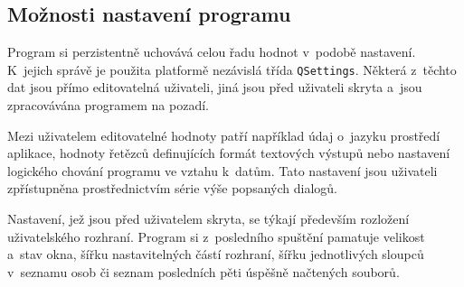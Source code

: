 		\subsection*{Možnosti nastavení programu}
		Program si perzistentně uchovává celou řadu hodnot v~podobě nastavení. K~jejich správě je použita platformě nezávislá třída \texttt{QSettings}. Některá z~těchto dat jsou přímo editovatelná uživateli, jiná jsou před uživateli skryta a~jsou zpracovávána programem na pozadí.\par
		Mezi uživatelem editovatelné hodnoty patří například údaj o~jazyku prostředí aplikace, hodnoty řetězců definujících formát textových výstupů nebo nastavení logického chování programu ve vztahu k~datům. Tato nastavení jsou uživateli zpřístupněna prostřednictvím série výše popsaných dialogů.\par
		Nastavení, jež jsou před uživatelem skryta, se týkají především rozložení uživatelského rozhraní. Program si z~posledního spuštění pamatuje velikost a~stav okna, šířku nastavitelných částí rozhraní, šířku jednotlivých sloupců v~seznamu osob či seznam posledních pěti úspěšně načtených souborů.\par
		
